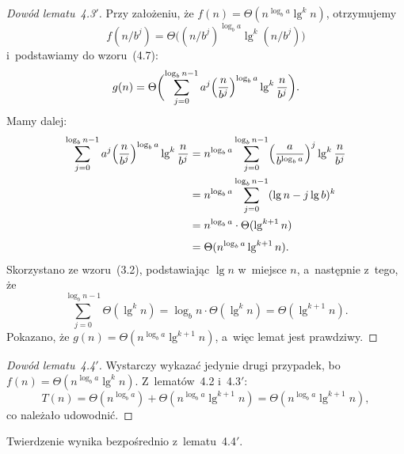 \begin{proof}[Dowód lematu~4.3\/$'$]
	Przy założeniu, że $f(n)=\Theta(n^{\log_ba}\lg^kn)$, otrzymujemy
	\[
		f(n/b^j)=\Theta\bigl((n/b^j)^{\log_ba}\lg^k(n/b^j)\bigr)
	\]
	i~podstawiamy do wzoru~(4.7):
	\[
		g(n) = \Theta\biggl(\sum_{j=0}^{\log_bn-1}a^j\Bigl(\frac{n}{b^j}\Bigr)^{\log_ba}\lg^k\frac{n}{b^j}\biggr).
	\]
	Mamy dalej:
	\begin{align*}
		\sum_{j=0}^{\log_bn-1}a^j\Bigl(\frac{n}{b^j}\Bigr)^{\log_ba}\lg^k\frac{n}{b^j} &= n^{\log_ba}\sum_{j=0}^{\log_bn-1}\Bigl(\frac{a}{b^{\log_ba}}\Bigr)^j\lg^k\frac{n}{b^j} \\
		&= n^{\log_ba}\sum_{j=0}^{\log_bn-1}(\lg n-j\lg b)^k \\
		&= n^{\log_ba}\cdot\Theta(\lg^{k+1}n) \\[1mm]
		&= \Theta(n^{\log_ba}\lg^{k+1}n).
	\end{align*}
	Skorzystano ze wzoru~(3.2), podstawiając $\lg n$ w~miejsce $n$, a~następnie z~tego, że
	\[
		\sum_{j=0}^{\log_bn-1}\Theta(\lg^kn) = \log_bn\cdot\Theta(\lg^kn) = \Theta(\lg^{k+1}n).
	\]
	Pokazano, że $g(n)=\Theta(n^{\log_ba}\lg^{k+1}n)$, a~więc lemat jest prawdziwy.
\end{proof}

\begin{proof}[Dowód lematu~4.4\/$'$]
	Wystarczy wykazać jedynie drugi przypadek, bo $f(n)=\Theta(n^{\log_ba}\lg^kn)$. Z~lematów~4.2 i~4.3$'$:
	\[
		T(n) = \Theta(n^{\log_ba})+\Theta(n^{\log_ba}\lg^{k+1}n) = \Theta(n^{\log_ba}\lg^{k+1}n),
	\]
	co należało udowodnić.
\end{proof}

Twierdzenie wynika bezpośrednio z~lematu~4.4$'$.

\exercise %

